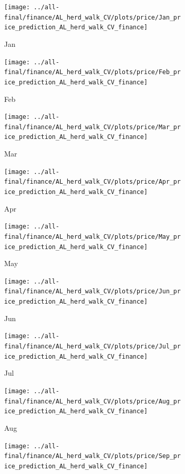 \documentclass[ngerman]{ttlab-qualify}
\begin{document}
\newpage
\begin{figure}[H]
\centering
  \begin{subfigure}{.3\linewidth}
  \texttt{[image: ../all-final/finance/AL\_herd\_walk\_CV/plots/price/Jan\_price\_prediction\_AL\_herd\_walk\_CV\_finance]}\hfill
  \caption{Jan}
  \end{subfigure}
  \begin{subfigure}{.3\linewidth}
  \texttt{[image: ../all-final/finance/AL\_herd\_walk\_CV/plots/price/Feb\_price\_prediction\_AL\_herd\_walk\_CV\_finance]}\hfill
  \caption{Feb}
  \end{subfigure}
  \begin{subfigure}{.3\linewidth}
  \texttt{[image: ../all-final/finance/AL\_herd\_walk\_CV/plots/price/Mar\_price\_prediction\_AL\_herd\_walk\_CV\_finance]}\hfill
  \caption{Mar}
  \end{subfigure}\par\medskip
  \begin{subfigure}{.3\linewidth}
  \texttt{[image: ../all-final/finance/AL\_herd\_walk\_CV/plots/price/Apr\_price\_prediction\_AL\_herd\_walk\_CV\_finance]}\hfill
  \caption{Apr}
  \end{subfigure}
  \begin{subfigure}{.3\linewidth}
  \texttt{[image: ../all-final/finance/AL\_herd\_walk\_CV/plots/price/May\_price\_prediction\_AL\_herd\_walk\_CV\_finance]}\hfill
  \caption{May}
  \end{subfigure}
  \begin{subfigure}{.3\linewidth}
  \texttt{[image: ../all-final/finance/AL\_herd\_walk\_CV/plots/price/Jun\_price\_prediction\_AL\_herd\_walk\_CV\_finance]}\hfill
  \caption{Jun}
  \end{subfigure}\par\medskip
  \begin{subfigure}{.3\linewidth}
  \texttt{[image: ../all-final/finance/AL\_herd\_walk\_CV/plots/price/Jul\_price\_prediction\_AL\_herd\_walk\_CV\_finance]}\hfill
  \caption{Jul}
  \end{subfigure}
  \begin{subfigure}{.3\linewidth}
  \texttt{[image: ../all-final/finance/AL\_herd\_walk\_CV/plots/price/Aug\_price\_prediction\_AL\_herd\_walk\_CV\_finance]}\hfill
  \caption{Aug}
  \end{subfigure}
  \begin{subfigure}{.3\linewidth}
  \texttt{[image: ../all-final/finance/AL\_herd\_walk\_CV/plots/price/Sep\_price\_prediction\_AL\_herd\_walk\_CV\_finance]}\hfill

\end{subfigure}
\end{figure}
\end{document}
